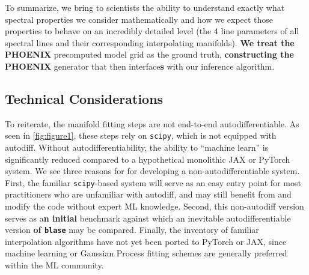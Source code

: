 \documentclass[twocolumn, linenumbers]{aastex631}
\begin{document}
To summarize, we bring to scientists the ability to understand exactly what spectral properties we consider mathematically and how we expect those properties to behave on an incredibly detailed level (the 4 line parameters of all spectral lines and their corresponding interpolating manifolds). \textbf{We treat the PHOENIX} precomputed model grid as the ground truth, \textbf{constructing the PHOENIX} generator that then interface\textbf{s} with our inference algorithm.

\subsection{Technical Considerations}
To reiterate, the manifold fitting steps are not end-to-end autodifferentiable.
As seen in \autoref{fig:figure1}, these steps rely on \texttt{scipy}, which is not equipped with autodiff.
Without autodifferentiability, the ability to ``machine learn'' is significantly reduced compared to a hypothetical monolithic JAX or PyTorch system.
We see three reasons for for developing a non-autodifferentiable system.
First, the familiar \texttt{scipy}-based system will serve as an easy entry point for most practitioners who are unfamiliar with autodiff, and may still benefit from and modify the code without expert ML knowledge.
Second, this non-autodiff version serves as a\textbf{n initial} benchmark against which an inevitable autodifferentiable version \textbf{of \texttt{blase}} may be compared.
Finally, the inventory of familiar interpolation algorithms have not yet been ported to PyTorch or JAX, since machine learning or Gaussian Process fitting schemes are generally preferred within the ML community.
\end{document}
